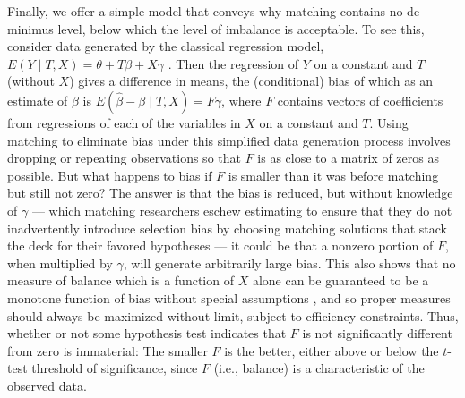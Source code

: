 \documentclass[11pt,titlepage]{article}
\begin{document}
Finally, we offer a simple model that conveys why matching contains no
de minimus level, below which the level of imbalance is acceptable.
To see this, consider data generated by the classical regression
model, $E(Y\mid T,X)= \theta + T\beta + X\gamma$ \citep{Goldberger91}.
Then the regression of $Y$ on a constant and $T$ (without $X$) gives a
difference in means, the (conditional) bias of which as an estimate of
$\beta$ is $E(\hat\beta-\beta\mid T,X) = F\gamma$, where $F$ contains
vectors of coefficients from regressions of each of the variables in
$X$ on a constant and $T$.  Using matching to eliminate bias under
this simplified data generation process involves dropping or repeating
observations so that $F$ is as close to a matrix of zeros as possible.
But what happens to bias if $F$ is smaller than it was before matching
but still not zero?  The answer is that the bias is reduced, but
without knowledge of $\gamma$ --- which matching researchers eschew
estimating to ensure that they do not inadvertently introduce
selection bias by choosing matching solutions that stack the deck for
their favored hypotheses --- it could be that a nonzero portion of
$F$, when multiplied by $\gamma$, will generate arbitrarily large
bias.  This also shows that no measure of balance which is a function
of $X$ alone can be guaranteed to be a monotone function of bias
without special assumptions \citep{RubStu06}, and so proper measures
should always be maximized without limit, subject to efficiency
constraints.  Thus, whether or not some hypothesis test indicates that
$F$ is not significantly different from zero is immaterial: The
smaller $F$ is the better, either above or below the $t$-test
threshold of significance, since $F$ (i.e., balance) is a
characteristic of the observed data.
\end{document}
